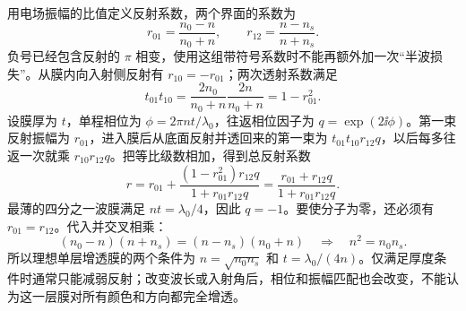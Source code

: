 用电场振幅的比值定义反射系数，两个界面的系数为
\[
 r_{01}=\frac{n_0-n}{n_0+n},\qquad
 r_{12}=\frac{n-n_s}{n+n_s}.
\]
负号已经包含反射的 $\pi$ 相变，使用这组带符号系数时不能再额外加一次“半波损失”。从膜内向入射侧反射有 $r_{10}=-r_{01}$；两次透射系数满足
\[
 t_{01}t_{10}=\frac{2n_0}{n_0+n}\frac{2n}{n_0+n}
 =1-r_{01}^2.
\]
设膜厚为 $t$，单程相位为 $\phi=2\pi nt/\lambda_0$，往返相位因子为 $q=\exp(2\ii\phi)$。第一束反射振幅为 $r_{01}$，进入膜后从底面反射并透回来的第一束为 $t_{01}t_{10}r_{12}q$，以后每多往返一次就乘 $r_{10}r_{12}q$。把等比级数相加，得到总反射系数
\[
 r=r_{01}+\frac{(1-r_{01}^2)r_{12}q}{1+r_{01}r_{12}q}
 =\frac{r_{01}+r_{12}q}{1+r_{01}r_{12}q}.
\]
最薄的四分之一波膜满足 $nt=\lambda_0/4$，因此 $q=-1$。要使分子为零，还必须有 $r_{01}=r_{12}$。代入并交叉相乘：
\[
 (n_0-n)(n+n_s)=(n-n_s)(n_0+n)
 \quad\Longrightarrow\quad n^2=n_0n_s.
\]
所以理想单层增透膜的两个条件为 $n=\sqrt{n_0n_s}$ 和 $t=\lambda_0/(4n)$。仅满足厚度条件时通常只能减弱反射；改变波长或入射角后，相位和振幅匹配也会改变，不能认为这一层膜对所有颜色和方向都完全增透。

